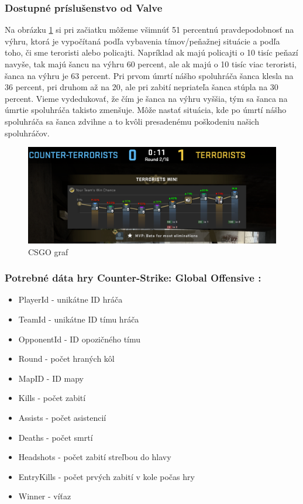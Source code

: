  \subsubsection{Dostupné príslušenstvo od Valve}
Na obrázku \ref{csgograf} si pri začiatku môžeme všimnúť 51 percentnú pravdepodobnosť na výhru, ktorá je vypočítaná podľa vybavenia tímov/peňažnej situácie a podľa toho, či sme teroristi alebo policajti. Napríklad ak majú policajti o 10 tisíc peňazí navyše, tak majú šancu na výhru 60 percent, ale ak majú o 10 tisíc viac teroristi, šanca na výhru je 63 percent. Pri prvom úmrtí nášho spoluhráča šanca klesla na 36 percent, pri druhom až na 20, ale pri zabití nepriateľa šanca stúpla na 30 percent. Vieme vydedukovať, že čím je šanca na výhru vyššia, tým sa šanca na úmrtie spoluhráča takisto zmenšuje. Môže nastať situácia, kde po úmrtí nášho spoluhráča sa šanca zdvihne a to kvôli presadenému poškodeniu našich spoluhráčov.
  
 \begin{figure}[h!]
 
 	\includegraphics[width=.9\textwidth]{figures/jednanula}
 	\centering
 	\caption{CSGO graf \label{csgograf}}

 \end{figure}

 

\subsubsection{Potrebné dáta hry Counter-Strike: Global Offensive :}

 \begin{itemize}
 	\item PlayerId - unikátne ID hráča
 	\item TeamId - unikátne ID tímu hráča
 	\item OpponentId - ID opozičného tímu
 	\item Round - počet hraných kôl
 	\item MapID - ID mapy
 	\item Kills - počet zabití
 	\item Assists - počet asistencií
 	\item Deaths - počet smrtí
 	\item Headshots - počet zabití streľbou do hlavy
 	\item EntryKills - počet prvých zabití v kole počas hry
 	\item Winner - víťaz
\end{itemize}
 

